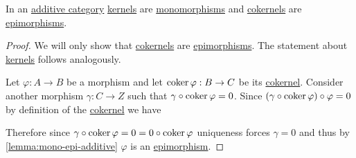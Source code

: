 \documentclass[../../../main]{subfiles}
\begin{document}
\begin{lemma}
  In an \hyperref[def:additive-category]{additive category} \hyperref[def:categorical-kernel]{kernels} are \hyperref[def:mono-epi-morphism]{monomorphisms} and \hyperref[def:categorical-cokernel]{cokernels} are \hyperref[def:mono-epi-morphism]{epimorphisms}.
\end{lemma}
\begin{proof}
  We will only show that \hyperref[def:categorical-cokernel]{cokernels} are \hyperref[def:mono-epi-morphism]{epimorphisms}. The statement about \hyperref[def:categorical-kernel]{kernels} follows analogously.

  Let \(\varphi: A \to B\) be a morphism and let \(\operatorname*{coker} \varphi: B \to C\) be its \hyperref[def:categorical-cokernel]{cokernel}.
  Consider another morphism \(\gamma: C \to Z\) such that \(\gamma \circ \operatorname*{coker} \varphi = 0\).
  Since \((\gamma \circ \operatorname*{coker} \varphi) \circ \varphi = 0\) by definition of the \hyperref[def:categorical-cokernel]{cokernel} we have
  \begin{center}
  \end{center}
  Therefore since \(\gamma \circ \operatorname*{coker} \varphi = 0 = 0 \circ \operatorname*{coker} \varphi\) uniqueness forces \(\gamma = 0\) and thus by \autoref{lemma:mono-epi-additive} \(\varphi\) is an \hyperref[def:mono-epi-morphism]{epimorphism}.
\end{proof}
\end{document}
